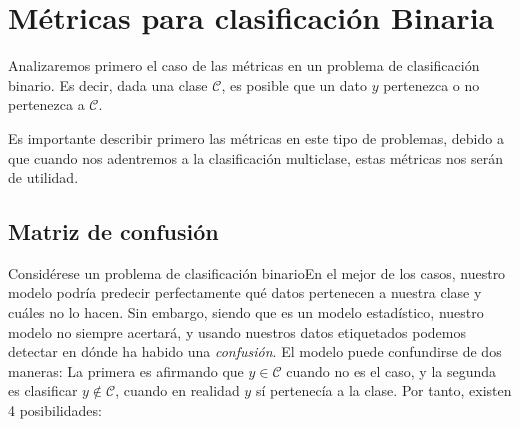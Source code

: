 \section{Métricas para clasificación Binaria}
Analizaremos primero el caso de las métricas en un problema de clasificación binario. Es decir, dada una clase $\mathcal C$, es posible que un dato $y$ pertenezca o no pertenezca a $\mathcal{C}$.

Es importante describir primero las métricas en este tipo de problemas, debido a que cuando nos adentremos a la clasificación multiclase, estas métricas nos serán de utilidad.
\subsection{Matriz de confusión}
Considérese un problema de clasificación binarioEn el mejor de los casos, nuestro modelo podría predecir perfectamente qué datos pertenecen a nuestra clase y cuáles no lo hacen. Sin embargo, siendo que es un modelo estadístico, nuestro modelo no siempre acertará, y usando nuestros datos etiquetados podemos detectar en dónde ha habido una \textsl{confusión}. El modelo puede confundirse de dos maneras: La primera es afirmando que $y\in \mathcal C$ cuando no es el caso, y la segunda es clasificar  $y\notin \mathcal C$, cuando en realidad $y$ sí pertenecía a la clase. Por tanto, existen 4 posibilidades:

